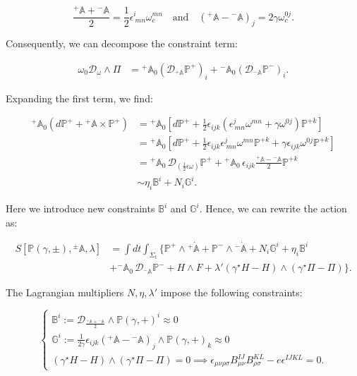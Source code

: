 \documentclass{article}
\begin{document}
$$
\frac{{}^{+}\mathbb{A} + {}^{-}\mathbb{A}}{2} = \frac{1}{2} \epsilon^i_{\ mn} \omega^{mn}_c \quad \text{and} \quad ({}^{+}\mathbb{A} - {}^{-}\mathbb{A})_j = 2\gamma \omega^{0j}_c.
$$

Consequently, we can decompose the constraint term:

$$
\begin{aligned}
\omega_0 \mathcal{D}_\omega \wedge \Pi &= {}^{+}\mathbb{A}_0 (\mathcal{D}_{{}^{+}\mathbb{A}} \mathbb{P}^{+})_i + {}^{-}\mathbb{A}_0 (\mathcal{D}_{{}^{-}\mathbb{A}} \mathbb{P}^{-})_i.
\end{aligned}
$$

Expanding the first term, we find:

$$
\begin{aligned}
{}^{+}\mathbb{A}_0 \left( d \mathbb{P}^{+} + {}^{+}\mathbb{A} \times \mathbb{P}^{+} \right) &= {}^{+}\mathbb{A}_0 \left[ d \mathbb{P}^{+} + \frac{1}{2}\epsilon_{ijk} \left( \epsilon^j_{\ mn} \omega^{mn} + \gamma \omega^{0j} \right) \mathbb{P}^{+k}\right] \\
&= {}^{+}\mathbb{A}_0 \left[ d \mathbb{P}^{+} + \frac{1}{2} \epsilon_{ijk} \epsilon^j_{\ mn} \omega^{mn} \mathbb{P}^{+k} + \gamma \epsilon_{ijk} \omega^{0j} \mathbb{P}^{+k} \right] \\
&= {}^{+}\mathbb{A}_0 \, \mathcal{D}_{\left(\frac{1}{2}\epsilon \omega\right)} \mathbb{P}^{+} + {}^{+}\mathbb{A}_0 \, \epsilon_{ijk} \frac{{}^{+}\mathbb{A} - {}^{-}\mathbb{A}}{2} \mathbb{P}^{+k} \\
&\sim \eta_i \mathbb{B}^i + N_i \mathbb{G}^i.
\end{aligned}
$$

Here we introduce new constraints $\mathbb{B}^i$ and $\mathbb{G}^i$. Hence, we can rewrite the action as:

$$
\begin{aligned}
S[\mathbb{P}(\gamma, \pm), {}^{\pm}\mathbb{A}, \lambda] &= \int dt \int_{\Sigma_t} \Big\{ \mathbb{P}^{+} \wedge {}^{+}\dot{\mathbb{A}} + \mathbb{P}^{-} \wedge {}^{-}\dot{\mathbb{A}} + N_i \mathbb{G}^i + \eta_i \mathbb{B}^i \\
&+ {}^{-}\mathbb{A}_0 \, \mathcal{D}_{{}^{-}\mathbb{A}} \mathbb{P}^{-} + H \wedge F + \lambda' (\gamma ^\star H - H) \wedge (\gamma ^\star \Pi - \Pi) \Big\}.
\end{aligned}
$$

The Lagrangian multipliers $N, \eta, \lambda'$ impose the following constraints:

$$
\begin{cases}
\mathbb{B}^i := \mathcal{D}_{\frac{{}^{+}\mathbb{A} + {}^{-}\mathbb{A}}{2}} \wedge \mathbb{P}(\gamma, +)^i \approx 0 \\
\mathbb{G}^i := \frac{1}{2\gamma} \epsilon_{ijk} ({}^{+}\mathbb{A} - {}^{-}\mathbb{A})_j \wedge \mathbb{P}(\gamma, +)_k \approx 0 \\
(\gamma^\star H - H)\wedge(\gamma^\star \Pi - \Pi) = 0 \implies \epsilon_{\mu\nu\rho\sigma} B^{IJ}_{\mu\nu} B^{KL}_{\rho\sigma} - e\epsilon^{IJKL} = 0.
\end{cases}
$$
\end{document}
